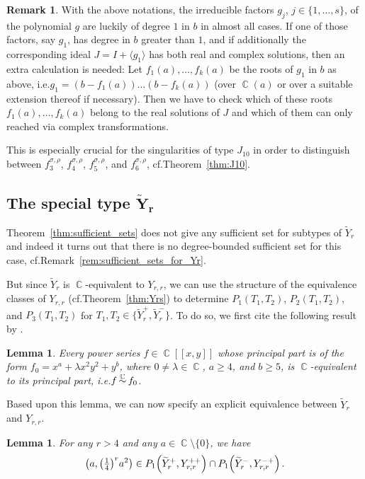 \documentclass[noend]{amsproc}
\newtheorem{lemma}[theorem]{Lemma}
\theoremstyle{definition}
\newtheorem{remark}[theorem]{Remark}
\let\originalleft\left
\let\originalright\right
\renewcommand{\left}{\mathopen{}\mathclose\bgroup\originalleft}
\renewcommand{\right}{\aftergroup\egroup\originalright}
\newcommand{\tY}{\widetilde{Y}}
\DeclareMathOperator{\csim}{\mathrel{\smash{\overset{\C}{\sim}}}}
\DeclareMathOperator{\C}{\mathbb{C}}
\begin{document}
\begin{remark}
With the above notations, the irreducible factors $g_j$,
$j \in \{1,\ldots,s\}$, of the polynomial $g$ are luckily of degree $1$ in $b$
in almost all cases. If one of those factors, say $g_1$, has degree in $b$
greater than $1$, and if additionally the corresponding ideal $J = I + \langle
g_1 \rangle$ has both real and complex solutions, then an extra calculation is
needed: Let $f_1(a), \ldots, f_k(a)$ be the roots of $g_1$ in $b$ as above,
i.e.\@ $g_1 = (b-f_1(a)) \ldots (b-f_k(a))$ (over $\C(a)$ or over a suitable
extension thereof if necessary). Then we have to check which of these roots
$f_1(a), \ldots, f_k(a)$ belong to the real solutions of $J$ and which of them
can only reached via complex transformations.

This is especially crucial for the singularities of type $J_{10}$ in order to
distinguish between $f_3^{\sigma,\rho}$, $f_4^{\sigma,\rho}$,
$f_5^{\sigma,\rho}$, and $f_6^{\sigma,\rho}$, cf.\@ Theorem~\ref{thm:J10}.
\end{remark}


\subsection{The special type $\boldsymbol{\tY_r}$}

Theorem~\ref{thm:sufficient_sets} does not give any sufficient set for subtypes
of $\tY_r$ and indeed it turns out that there is no degree-bounded sufficient
set for this case, cf.\@ Remark~\ref{rem:sufficient_sets_for_Yr}.

But since $\tY_r$ is $\C$-equivalent to $Y_{r,r}$, we can use the structure of
the equivalence classes of $Y_{r,r}$ (cf.\@ Theorem~\ref{thm:Yrs}) to determine
$P_1(T_1, T_2)$, $P_2(T_1, T_2)$, and $P_3(T_1, T_2)$ for
$T_1, T_2 \in \bigl\{\tY_r^+, \tY_r^-\bigr\}$. To do so, we first cite the
following result by \citet[Corollary~9.9]{A1974}.

\begin{lemma}\label{lem:principalpart}
Every power series $f \in \C[[x,y]]$ whose principal part is of the form
$f_0 = x^a+\lambda x^2y^2+y^b$, where $0 \neq \lambda \in \C$, $a \geq 4$, and
$b \geq 5$, is $\C$-equivalent to its principal part, i.e.\@ $f \csim f_0$.
\end{lemma}

Based upon this lemma, we can now specify an explicit equivalence between
$\tY_r$ and $Y_{r,r}$.

\begin{lemma}\label{lem:Yr_equivalences}
For any $r > 4$ and any $a \in \C \setminus \{0\}$, we have
\[
\left(a, \left(\textstyle\frac{1}{4}\right)^r a^2\right)
\in P_1\left(\tY_r^+, Y_{r,r}^{++}\right)
\cap P_1\left(\tY_r^-, Y_{r,r}^{-+}\right) \,.
\]
\end{lemma}
\end{document}
